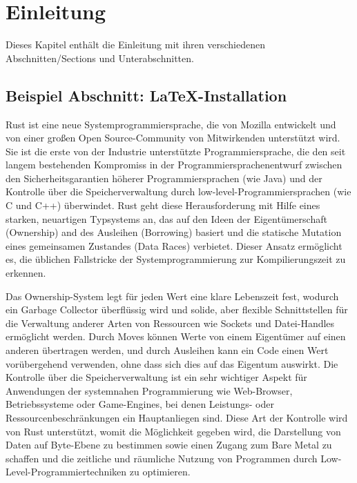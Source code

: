 \chapter{Einleitung}

\nocite{*}

Dieses Kapitel enthält die Einleitung mit ihren verschiedenen Abschnitten/Sections und Unterabschnitten.

\section{Beispiel Abschnitt: \LaTeX-Installation}

Rust ist eine neue Systemprogrammiersprache, die von Mozilla entwickelt und von einer großen Open Source-Community von Mitwirkenden unterstützt wird. Sie ist die erste von der Industrie unterstützte Programmiersprache, die den seit langem bestehenden Kompromiss in der Programmiersprachenentwurf zwischen den Sicherheitsgarantien höherer Programmiersprachen (wie Java) und der Kontrolle über die Speicherverwaltung durch low-level-Programmiersprachen (wie C und C++) überwindet. Rust geht diese Herausforderung mit Hilfe eines starken, neuartigen Typsystems an, das auf den Ideen der Eigentümerschaft (Ownership) and des Ausleihen (Borrowing) basiert und die statische Mutation eines gemeinsamen Zustandes (Data Races) verbietet. Dieser Ansatz ermöglicht es, die üblichen Fallstricke der Systemprogrammierung zur Kompilierungszeit zu erkennen. 

Das Ownership-System legt für jeden Wert eine klare Lebenszeit fest, wodurch ein Garbage Collector überflüssig wird und solide, aber flexible Schnittstellen für die Verwaltung anderer Arten von Ressourcen wie Sockets und Datei-Handles ermöglicht werden. Durch \glqq Moves\grqq{} können Werte von einem Eigentümer auf einen anderen übertragen werden, und durch Ausleihen kann ein Code einen Wert vorübergehend verwenden, ohne dass sich dies auf das Eigentum auswirkt. 
Die Kontrolle über die Speicherverwaltung ist ein sehr wichtiger Aspekt für Anwendungen der systemnahen Programmierung wie Web-Browser, Betriebssysteme oder Game-Engines, bei denen Leistungs- oder Ressourcenbeschränkungen ein Hauptanliegen sind. Diese Art der Kontrolle wird von Rust unterstützt, womit die Möglichkeit gegeben wird, die Darstellung von Daten auf Byte-Ebene zu bestimmen sowie einen Zugang zum \glqq Bare Metal\grqq{} zu schaffen und die zeitliche und räumliche Nutzung von Programmen durch Low-Level-Programmiertechniken zu optimieren.

